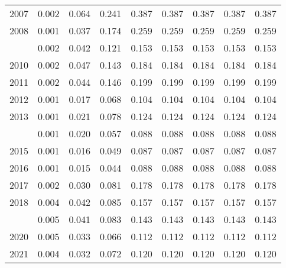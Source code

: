 \documentclass[
]{article}
\begin{document}
\begin{longtable}[t]{lrrrrrrrr}
2007 & 0.002 & 0.064 & 0.241 & 0.387 & 0.387 & 0.387 & 0.387 & 0.387\\
2008 & 0.001 & 0.037 & 0.174 & 0.259 & 0.259 & 0.259 & 0.259 & 0.259\\
\addlinespace
2009 & 0.002 & 0.042 & 0.121 & 0.153 & 0.153 & 0.153 & 0.153 & 0.153\\
2010 & 0.002 & 0.047 & 0.143 & 0.184 & 0.184 & 0.184 & 0.184 & 0.184\\
2011 & 0.002 & 0.044 & 0.146 & 0.199 & 0.199 & 0.199 & 0.199 & 0.199\\
2012 & 0.001 & 0.017 & 0.068 & 0.104 & 0.104 & 0.104 & 0.104 & 0.104\\
2013 & 0.001 & 0.021 & 0.078 & 0.124 & 0.124 & 0.124 & 0.124 & 0.124\\
\addlinespace
2014 & 0.001 & 0.020 & 0.057 & 0.088 & 0.088 & 0.088 & 0.088 & 0.088\\
2015 & 0.001 & 0.016 & 0.049 & 0.087 & 0.087 & 0.087 & 0.087 & 0.087\\
2016 & 0.001 & 0.015 & 0.044 & 0.088 & 0.088 & 0.088 & 0.088 & 0.088\\
2017 & 0.002 & 0.030 & 0.081 & 0.178 & 0.178 & 0.178 & 0.178 & 0.178\\
2018 & 0.004 & 0.042 & 0.085 & 0.157 & 0.157 & 0.157 & 0.157 & 0.157\\
\addlinespace
2019 & 0.005 & 0.041 & 0.083 & 0.143 & 0.143 & 0.143 & 0.143 & 0.143\\
2020 & 0.005 & 0.033 & 0.066 & 0.112 & 0.112 & 0.112 & 0.112 & 0.112\\
2021 & 0.004 & 0.032 & 0.072 & 0.120 & 0.120 & 0.120 & 0.120 & 0.120\\*
\end{longtable}
\end{document}

